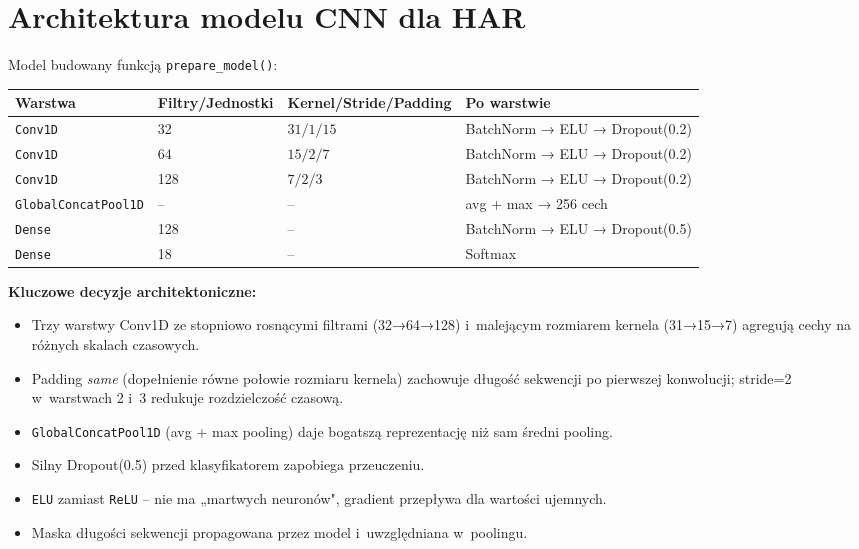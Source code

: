 \documentclass[12pt,a4paper]{article}
\begin{document}
\section{Architektura modelu CNN dla HAR}

Model budowany funkcją \texttt{prepare\_model()}:

\begin{center}
\begin{tabular}{@{}llll@{}}
\toprule
Warstwa & Filtry/Jednostki & Kernel/Stride/Padding & Po warstwie \\
\midrule
\texttt{Conv1D}         & 32   & $31 / 1 / 15$  & BatchNorm → ELU → Dropout(0.2) \\
\texttt{Conv1D}         & 64   & $15 / 2 / 7$   & BatchNorm → ELU → Dropout(0.2) \\
\texttt{Conv1D}         & 128  & $7  / 2 / 3$   & BatchNorm → ELU → Dropout(0.2) \\
\texttt{GlobalConcatPool1D} & -- & --           & avg + max → 256 cech \\
\texttt{Dense}          & 128  & --             & BatchNorm → ELU → Dropout(0.5) \\
\texttt{Dense}          & 18   & --             & Softmax \\
\bottomrule
\end{tabular}
\end{center}

\textbf{Kluczowe decyzje architektoniczne:}
\begin{itemize}
  \item Trzy warstwy Conv1D ze stopniowo rosnącymi filtrami (32→64→128) i~malejącym rozmiarem kernela (31→15→7) agregują cechy na różnych skalach czasowych.
  \item Padding \textit{same} (dopełnienie równe połowie rozmiaru kernela) zachowuje długość sekwencji po pierwszej konwolucji; stride=2 w~warstwach 2 i~3 redukuje rozdzielczość czasową.
  \item \texttt{GlobalConcatPool1D} (avg + max pooling) daje bogatszą reprezentację niż sam średni pooling.
  \item Silny Dropout(0.5) przed klasyfikatorem zapobiega przeuczeniu.
  \item \texttt{ELU} zamiast \texttt{ReLU} -- nie ma „martwych neuronów", gradient przepływa dla wartości ujemnych.
  \item Maska długości sekwencji propagowana przez model i~uwzględniana w~poolingu.
\end{itemize}
\end{document}

